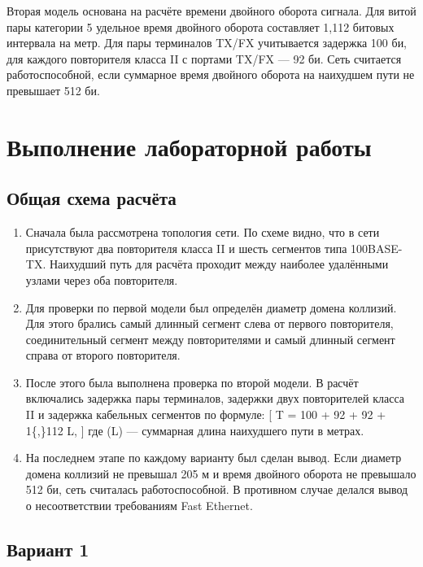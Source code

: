 \documentclass[
  english,
  russian,
  12pt,
  a4paper,
  DIV=11,
  numbers=noendperiod]{scrreprt}
\begin{document}
Вторая модель основана на расчёте времени двойного оборота сигнала. Для
витой пары категории 5 удельное время двойного оборота составляет 1,112
битовых интервала на метр. Для пары терминалов TX/FX учитывается
задержка 100 би, для каждого повторителя класса II с портами TX/FX ---
92 би. Сеть считается работоспособной, если суммарное время двойного
оборота на наихудшем пути не превышает 512 би.

\chapter{Выполнение лабораторной
работы}\label{ux432ux44bux43fux43eux43bux43dux435ux43dux438ux435-ux43bux430ux431ux43eux440ux430ux442ux43eux440ux43dux43eux439-ux440ux430ux431ux43eux442ux44b}

\section{Общая схема
расчёта}\label{ux43eux431ux449ux430ux44f-ux441ux445ux435ux43cux430-ux440ux430ux441ux447ux451ux442ux430}

\begin{enumerate}
\def\labelenumi{\arabic{enumi}.}
\item
  Сначала была рассмотрена топология сети. По схеме видно, что в сети
  присутствуют два повторителя класса II и шесть сегментов типа
  100BASE-TX. Наихудший путь для расчёта проходит между наиболее
  удалёнными узлами через оба повторителя.
\item
  Для проверки по первой модели был определён диаметр домена коллизий.
  Для этого брались самый длинный сегмент слева от первого повторителя,
  соединительный сегмент между повторителями и самый длинный сегмент
  справа от второго повторителя.
\item
  После этого была выполнена проверка по второй модели. В расчёт
  включались задержка пары терминалов, задержки двух повторителей класса
  II и задержка кабельных сегментов по формуле: {[} T = 100 + 92 + 92 +
  1\{,\}112 \cdot L, {]} где (L) --- суммарная длина наихудшего пути в
  метрах.
\item
  На последнем этапе по каждому варианту был сделан вывод. Если диаметр
  домена коллизий не превышал 205 м и время двойного оборота не
  превышало 512 би, сеть считалась работоспособной. В противном случае
  делался вывод о несоответствии требованиям Fast Ethernet.
\end{enumerate}

\section{Вариант 1}\label{ux432ux430ux440ux438ux430ux43dux442-1}
\end{document}
